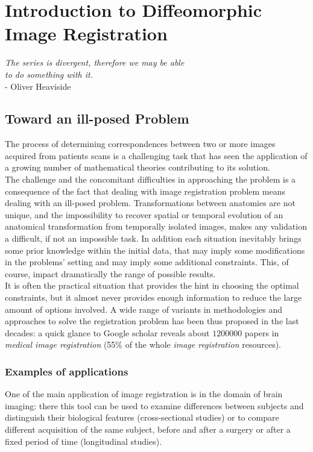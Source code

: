 \chapter{Introduction to Diffeomorphic Image Registration}\label{ch:introduction}


\begin{flushright}
		\emph{The series is divergent, therefore we may be able \\ to do something with it.}\\
			- Oliver Heaviside
\end{flushright}

\vspace{0.6cm}


\section{Toward an ill-posed Problem}

The process of determining correspondences between two or more images acquired from patients scans is a challenging task that has seen the application of a growing number of mathematical theories contributing to its solution.\\
The challenge and the concomitant difficulties in approaching the problem is a consequence of the fact that dealing with image registration problem means dealing with an ill-posed problem. Transformations between anatomies are not unique, and the impossibility to recover spatial or temporal evolution of an anatomical transformation from temporally isolated images, makes any validation a difficult, if not an impossible task. 
In addition each situation inevitably brings some prior knowledge within the initial data, that may imply some modifications in the problems' setting and may imply some additional constraints. This, of course, impact dramatically the range of possible results. \\

It is often the practical situation that provides the hint in choosing the optimal constraints, but it almost never provides enough information to reduce the large amount of options involved. A wide range of variants in methodologies and approaches to solve the registration problem has been thus proposed in the last decades: a quick glance to Google scholar reveals about $1200000$ papers in \emph{medical image registration} (55\% of the whole \emph{image registration} resources). 

\subsection{Examples of applications}
One of the main application of image registration is in the domain of brain imaging: there this tool can be used to examine differences between subjects and distinguish their biological features (cross-sectional studies) or to compare different acquisition of the same subject, before and after a surgery or after a fixed period of time (longitudinal studies). \\

